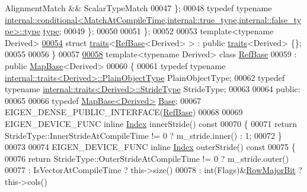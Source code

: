 \begin{DoxyCode}
      AlignmentMatch && ScalarTypeMatch
00047     \};
00048     \textcolor{keyword}{typedef} \textcolor{keyword}{typename} 
      \hyperlink{class_eigen_1_1internal_1_1_tensor_lazy_evaluator_writable}{internal::conditional<MatchAtCompileTime,internal::true\_type,internal::false\_type>::type}
       \hyperlink{class_eigen_1_1internal_1_1_tensor_lazy_evaluator_writable}{type};
00049   \};
00050   
00051 \};
00052 
00053 \textcolor{keyword}{template}<\textcolor{keyword}{typename} Derived>
\hyperlink{struct_eigen_1_1internal_1_1traits_3_01_ref_base_3_01_derived_01_4_01_4}{00054} \textcolor{keyword}{struct }\hyperlink{struct_eigen_1_1internal_1_1traits}{traits}<\hyperlink{class_eigen_1_1_ref_base}{RefBase}<Derived> > : \textcolor{keyword}{public} \hyperlink{struct_eigen_1_1internal_1_1traits}{traits}<Derived> \{\};
00055 
00056 \}
00057 
\hyperlink{class_eigen_1_1_ref_base}{00058} \textcolor{keyword}{template}<\textcolor{keyword}{typename} Derived> \textcolor{keyword}{class }\hyperlink{class_eigen_1_1_ref_base}{RefBase}
00059  : \textcolor{keyword}{public} \hyperlink{class_eigen_1_1_map_base}{MapBase}<Derived>
00060 \{
00061   \textcolor{keyword}{typedef} \textcolor{keyword}{typename} \hyperlink{struct_eigen_1_1internal_1_1traits}{internal::traits<Derived>::PlainObjectType} 
      PlainObjectType;
00062   \textcolor{keyword}{typedef} \textcolor{keyword}{typename} \hyperlink{struct_eigen_1_1internal_1_1traits}{internal::traits<Derived>::StrideType} StrideType;
00063 
00064 \textcolor{keyword}{public}:
00065 
00066   \textcolor{keyword}{typedef} \hyperlink{class_eigen_1_1_map_base}{MapBase<Derived>} \hyperlink{class_eigen_1_1_map_base}{Base};
00067   EIGEN\_DENSE\_PUBLIC\_INTERFACE(\hyperlink{class_eigen_1_1_ref_base}{RefBase})
00068 
00069   EIGEN\_DEVICE\_FUNC \textcolor{keyword}{inline} \hyperlink{namespace_eigen_a62e77e0933482dafde8fe197d9a2cfde}{Index} innerStride()\textcolor{keyword}{ const}
00070 \textcolor{keyword}{  }\{
00071     \textcolor{keywordflow}{return} StrideType::InnerStrideAtCompileTime != 0 ? m\_stride.inner() : 1;
00072   \}
00073 
00074   EIGEN\_DEVICE\_FUNC \textcolor{keyword}{inline} \hyperlink{namespace_eigen_a62e77e0933482dafde8fe197d9a2cfde}{Index} outerStride()\textcolor{keyword}{ const}
00075 \textcolor{keyword}{  }\{
00076     \textcolor{keywordflow}{return} StrideType::OuterStrideAtCompileTime != 0 ? m\_stride.outer()
00077          : IsVectorAtCompileTime ? this->size()
00078          : int(Flags)&\hyperlink{group__flags_gae4f56c2a60bbe4bd2e44c5b19cbe8762}{RowMajorBit} ? this->cols()

\end{DoxyCode}

